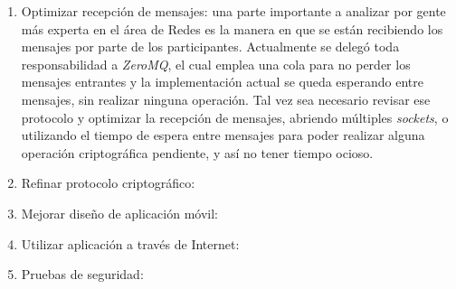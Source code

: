 \begin{enumerate}
    \item Optimizar recepción de mensajes: una parte importante a analizar por gente 
    más experta en el área de Redes es la manera en que se están recibiendo los 
    mensajes por parte de los participantes. Actualmente se delegó toda responsabilidad 
    a \emph{ZeroMQ}, el cual emplea una cola para no perder los mensajes entrantes 
    y la implementación actual se queda esperando entre mensajes, sin realizar 
    ninguna operación. Tal vez sea necesario revisar ese protocolo y optimizar la recepción de mensajes, abriendo múltiples \emph{sockets}, o utilizando el tiempo de espera entre mensajes para poder realizar alguna operación criptográfica pendiente, 
    y así no tener tiempo ocioso.
    
    \item Refinar protocolo criptográfico: 
    
    \item Mejorar diseño de aplicación móvil:
    
    \item Utilizar aplicación a través de Internet:
    
    \item Pruebas de seguridad:
\end{enumerate}